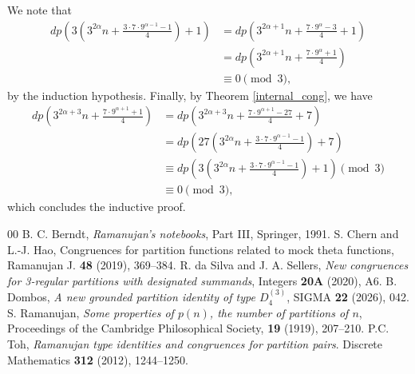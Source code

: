 \documentclass{amsart}
\begin{document}
We note that
\begin{align*}
dp \left( 3 \left( 3^{2\alpha}n + \frac{3\cdot 7 \cdot 9^{\alpha-1} -1}{4} \right) +1 \right) & = dp \left(  3^{2\alpha+1}n + \frac{7 \cdot 9^{\alpha} -3}{4} +1 \right) \\
& = dp \left(  3^{2\alpha+1}n + \frac{7 \cdot 9^{\alpha} +1}{4} \right) \\
& \equiv 0 \pmod{3},
\end{align*}
by the induction hypothesis. Finally, by Theorem \ref{internal_cong}, we have
\begin{align*}
dp \left( 3^{2\alpha + 3}n + \frac{7 \cdot 9^{\alpha+1} + 1}{4} \right) & = dp \left( 3^{2\alpha + 3}n + \frac{7 \cdot 9^{\alpha+1} -27}{4} + 7 \right) \\
& = dp \left( 27 \left( 3^{2\alpha}n + \frac{3 \cdot 7 \cdot 9^{\alpha-1} - 1}{4} \right) + 7 \right) \\
& \equiv dp \left( 3 \left( 3^{2\alpha}n + \frac{3\cdot 7 \cdot 9^{\alpha-1} -1}{4} \right) +1 \right) \pmod{3}\\
& \equiv 0 \pmod{3},
\end{align*}
which concludes the inductive proof.

\begin{thebibliography}{00}
 B. C. Berndt, {\it Ramanujan's notebooks}, Part III, Springer, 1991.
 S. Chern and L.-J. Hao, {Congruences for partition functions related to mock theta functions}, Ramanujan J. {\bf 48} (2019), 369--384.
 R. da Silva and J. A. Sellers, {\it New congruences for 3-regular partitions with designated summands}, Integers {\bf 20A} (2020), A6.
  B. Dombos, {\it A new grounded partition identity of type $D_4^{(3)}$}, SIGMA {\bf 22} (2026), 042.  
 S. Ramanujan, {\it Some properties of $p(n)$, the number of partitions of $n$}, Proceedings of the Cambridge Philosophical Society, {\bf 19} (1919), 207--210.
  P.C. Toh, \textit{Ramanujan type identities and congruences for partition pairs}. Discrete Mathematics {\bf 312} (2012), 1244--1250.
\end{thebibliography}
\end{document}
